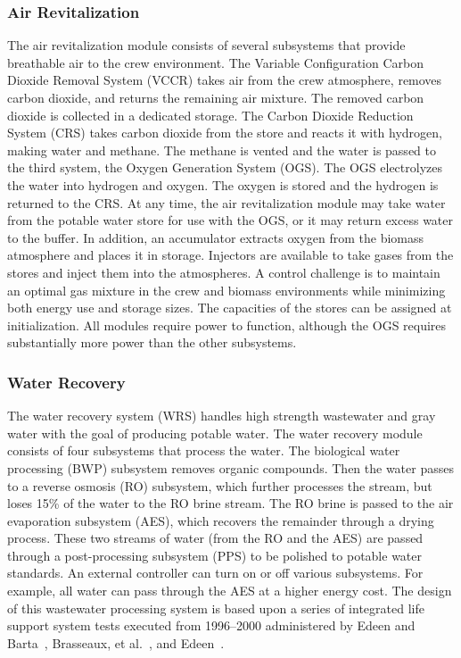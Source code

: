 \documentclass[submit]{aiaa}
\begin{document}
\subsubsection{Air Revitalization}

The air revitalization module consists of several subsystems that
provide breathable air to the crew environment.  The Variable
Configuration Carbon Dioxide Removal System (VCCR) takes air from the
crew atmosphere, removes carbon dioxide, and returns the remaining air
mixture.  The removed carbon dioxide is collected in a 
dedicated storage.  The Carbon Dioxide Reduction System (CRS) takes carbon dioxide from the store and reacts it with hydrogen, making water and methane.  The methane is vented and the
water is passed to the third system, the Oxygen Generation System (OGS).
The OGS electrolyzes the water into hydrogen and oxygen. 
The oxygen is stored and the hydrogen is returned to the CRS.  
At any time, the  air revitalization module may take water from the potable water store for use with the OGS, or it may return excess water to the buffer.    
In addition, an accumulator extracts oxygen from the biomass atmosphere and places it in storage.  Injectors
are available to take gases from the stores and inject them into the
atmospheres.  
A control challenge is to maintain an optimal gas mixture in the crew
and biomass environments while minimizing both energy use  and
storage sizes.
The capacities of the stores can be assigned at
initialization.  All modules require power to function,
although the OGS requires substantially more power than the other
subsystems.

\subsubsection{Water Recovery}

The water recovery system (WRS) handles high strength wastewater and gray water with the goal of producing potable water.
The water recovery module consists of
four subsystems that process the water.  The biological water
processing (BWP) subsystem removes organic compounds.  Then the water
passes to a reverse osmosis (RO) subsystem, which further processes the stream, but loses 15\% of the water to the RO brine stream.
The RO brine is passed to the air evaporation subsystem (AES), which recovers the
remainder through a drying process.  
These two streams of water (from the RO and the AES) are
passed through a post-processing subsystem (PPS) to be polished to
potable water standards.  
An external controller can turn on or off various
subsystems.  For example, all water can pass through the AES at a
higher energy cost.  
The design of this wastewater processing system is based upon a series of integrated life support system tests executed from 1996--2000 administered by Edeen and Barta~\cite{ehti}, Brasseaux, et al.~\cite{lmlstpII}, and Edeen~\cite{lmlstpIII}.
\end{document}

